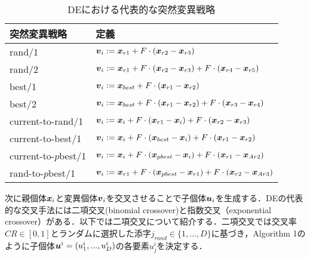 \documentclass[a4paper,11pt,oneside,openany]{jsbook}
\def\vector#1{\mbox{\boldmath $#1$}}
\begin{document}
\begin{table}[htb]
  \begin{center}
  \caption{DEにおける代表的な突然変異戦略}
    \begin{tabular}{ll} \hline
      突然変異戦略　& 定義  \\ \hline
      rand/1 & $\vector{v}_{i} := \vector{x}_{r1} + F\cdot(\vector{x}_{r2} - \vector{x}_{r3})$ \\
      rand/2 & $\vector{v}_{i} := \vector{x}_{r1} + F\cdot(\vector{x}_{r2} - \vector{x}_{r3}) + F\cdot(\vector{x}_{r4} - \vector{x}_{r5})$ \\
      best/1 & $\vector{v}_{i} := \vector{x}_{best} + F\cdot(\vector{x}_{r1} - \vector{x}_{r2})$ \\
      best/2 & $\vector{v}_{i} := \vector{x}_{best} + F\cdot(\vector{x}_{r1} - \vector{x}_{r2}) + F\cdot(\vector{x}_{r3} - \vector{x}_{r4})$ \\
      current-to-rand/1 & $\vector{v}_{i} := \vector{x}_{i} + F\cdot(\vector{x}_{r1} - \vector{x}_{i}) + F\cdot(\vector{x}_{r2} - \vector{x}_{r3})$ \\
      current-to-best/1 & $\vector{v}_{i} := \vector{x}_{i} + F\cdot(\vector{x}_{best} - \vector{x}_{i}) + F\cdot(\vector{x}_{r1} - \vector{x}_{r2})$ \\
      current-to-$p$best/1 & $\vector{v}_{i} := \vector{x}_{i} + F\cdot(\vector{x}_{pbest} - \vector{x}_{i}) + F\cdot(\vector{x}_{r1} - \vector{x}_{Ar2})$ \\
      rand-to-$p$best/1 & $\vector{v}_{i} := \vector{x}_{r1} + F\cdot(\vector{x}_{pbest} - \vector{x}_{r1}) + F\cdot(\vector{x}_{r2} - \vector{x}_{Ar3})$ \\ \hline
    \end{tabular}
  \end{center}
\end{table}


次に親個体$\vector{x}_i$と変異個体$\vector{v}_i$を交叉させることで子個体$\vector{u}_i$を生成する．DEの代表的な交叉手法には二項交叉(binomial crossover)と指数交叉（exponential crossover）がある．以下では二項交叉について紹介する．二項交叉では交叉率$CR \in [0,1]$とランダムに選択した添字$j_{rand} \in \{1,...,D\}$に基づき，Algorithm 1のように子個体$\vector{u}^i = (u^i_1,...,u^i_D)$の各要素$u^i_j$を決定する．
\end{document}
